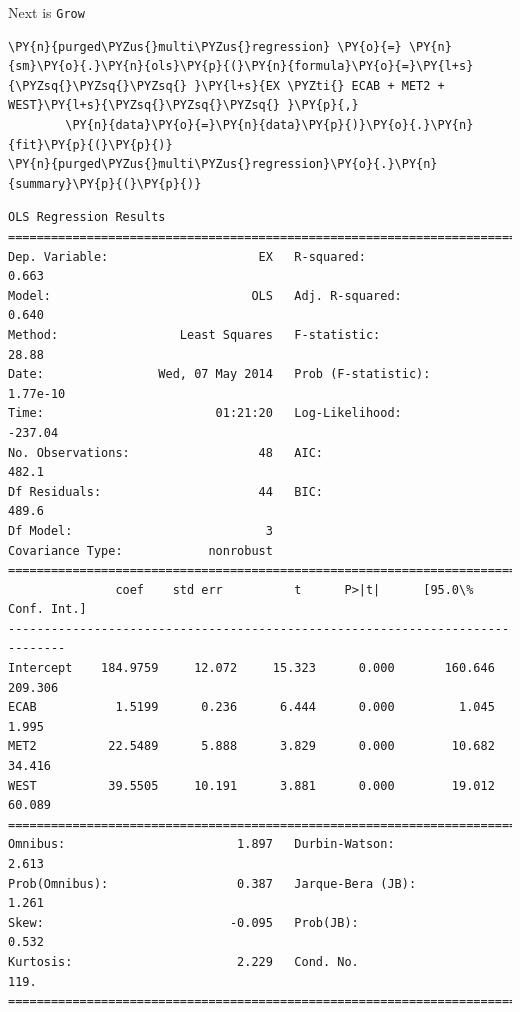 \documentclass[10pt]{article}\usepackage[]{graphicx}\usepackage[]{xcolor}
\begin{document}
    Next is \texttt{Grow}

    \begin{Verbatim}[commandchars=\\\{\}]
\PY{n}{purged\PYZus{}multi\PYZus{}regression} \PY{o}{=} \PY{n}{sm}\PY{o}{.}\PY{n}{ols}\PY{p}{(}\PY{n}{formula}\PY{o}{=}\PY{l+s}{\PYZsq{}\PYZsq{}\PYZsq{} }\PY{l+s}{EX \PYZti{} ECAB + MET2 + WEST}\PY{l+s}{\PYZsq{}\PYZsq{}\PYZsq{} }\PY{p}{,}
        \PY{n}{data}\PY{o}{=}\PY{n}{data}\PY{p}{)}\PY{o}{.}\PY{n}{fit}\PY{p}{(}\PY{p}{)}
\PY{n}{purged\PYZus{}multi\PYZus{}regression}\PY{o}{.}\PY{n}{summary}\PY{p}{(}\PY{p}{)}
\end{Verbatim}

\begin{Verbatim}[commandchars=\\\{\}]
                          OLS Regression Results                            
==============================================================================
Dep. Variable:                     EX   R-squared:                       0.663
Model:                            OLS   Adj. R-squared:                  0.640
Method:                 Least Squares   F-statistic:                     28.88
Date:                Wed, 07 May 2014   Prob (F-statistic):           1.77e-10
Time:                        01:21:20   Log-Likelihood:                -237.04
No. Observations:                  48   AIC:                             482.1
Df Residuals:                      44   BIC:                             489.6
Df Model:                           3                                         
Covariance Type:            nonrobust                                         
==============================================================================
               coef    std err          t      P>|t|      [95.0\% Conf. Int.]
------------------------------------------------------------------------------
Intercept    184.9759     12.072     15.323      0.000       160.646   209.306
ECAB           1.5199      0.236      6.444      0.000         1.045     1.995
MET2          22.5489      5.888      3.829      0.000        10.682    34.416
WEST          39.5505     10.191      3.881      0.000        19.012    60.089
==============================================================================
Omnibus:                        1.897   Durbin-Watson:                   2.613
Prob(Omnibus):                  0.387   Jarque-Bera (JB):                1.261
Skew:                          -0.095   Prob(JB):                        0.532
Kurtosis:                       2.229   Cond. No.                         119.
==============================================================================
\end{Verbatim}
        
\end{document}
